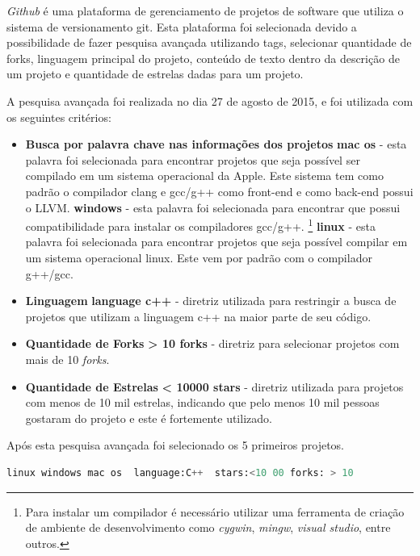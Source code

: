 \textit{Github} é uma plataforma de gerenciamento de projetos de software que
utiliza o sistema de versionamento git. Esta plataforma foi selecionada devido a
 possibilidade de fazer pesquisa avançada utilizando tags, selecionar quantidade de forks,
 linguagem principal do projeto, conteúdo de texto dentro da descrição de um projeto e
 quantidade de estrelas dadas para um projeto.


A pesquisa avançada foi realizada no dia 27 de agosto de 2015, e foi utilizada
 com os seguintes critérios:

\begin{itemize}
    \item \textbf{Busca por palavra chave nas informações dos projetos}
        \subitem \textbf{mac os} - esta palavra foi selecionada para encontrar projetos
 que seja possível ser compilado em um sistema operacional da Apple. Este sistema tem
 como padrão o compilador clang e gcc/g++ como front-end  e como back-end possui o LLVM.
        \subitem \textbf{windows} - esta palavra foi selecionada para encontrar 
 que possui compatibilidade para instalar os compiladores gcc/g++.
\footnote{Para instalar um compilador é necessário utilizar uma ferramenta de criação de ambiente de desenvolvimento como \textit{cygwin}, \textit{mingw}, \textit{visual studio}, entre outros.}
        \subitem \textbf{linux} - esta palavra foi selecionada para encontrar projetos
 que seja possível compilar em um sistema operacional linux. Este vem por padrão com
 o compilador g++/gcc.
    \item \textbf{Linguagem}
        \subitem \textbf{language c++} - diretriz utilizada para restringir a busca de 
projetos que utilizam a linguagem c++ na maior parte de seu código.
    \item \textbf{Quantidade de Forks}
        \subitem \textbf{ > 10 forks} - diretriz para selecionar projetos com
 mais de 10 \textit{forks}.
    \item \textbf{Quantidade de Estrelas}
        \subitem \textbf{ < 10000 stars } - diretriz utilizada para projetos com menos
 de 10 mil estrelas, indicando que pelo menos 10 mil pessoas gostaram do projeto e este
é fortemente utilizado. 
\end{itemize}

Após esta pesquisa avançada foi selecionado os 5 primeiros projetos.


\begin{lstlisting}[language=python, caption={Busca avançada github },
                  label=busca_avanacada_github]
     linux windows mac os  language:C++  stars:<10 00 forks: > 10
\end{lstlisting}


